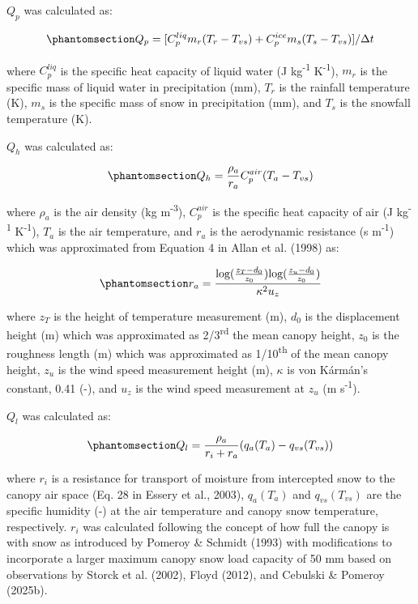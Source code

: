 \documentclass[
  letterpaper,
]{tex/uofsthesis-cs}
\begin{document}
\(Q_p\) was calculated as:

\begin{equation}\phantomsection\label{eq-qp}{
Q_p = [C_p^{liq} m_r(T_r - T_{vs}) + C_p^{ice} m_s(T_s - T_{vs})] / \Delta t
}\end{equation}

where \(C_p^{liq}\) is the specific heat capacity of liquid water (J
kg\textsuperscript{-1} K\textsuperscript{-1}), \(m_r\) is the specific
mass of liquid water in precipitation (mm), \(T_r\) is the rainfall
temperature (K), \(m_s\) is the specific mass of snow in precipitation
(mm), and \(T_s\) is the snowfall temperature (K).

\(Q_h\) was calculated as:

\begin{equation}\phantomsection\label{eq-qh}{
Q_h = \frac{\rho_a}{r_a} C_p^{air} (T_a - T_{vs})
}\end{equation}

where \(\rho_a\) is the air density (kg m\textsuperscript{-3}),
\(C_p^{air}\) is the specific heat capacity of air (J
kg\textsuperscript{-1} K\textsuperscript{-1}), \(T_a\) is the air
temperature, and \(r_a\) is the aerodynamic resistance (s
m\textsuperscript{-1}) which was approximated from Equation 4 in Allan
et al. (1998) as:

\begin{equation}\phantomsection\label{eq-ra}{
r_a = \frac{\text{log}(\frac{z_T - d_0}{z_0})\text{log}(\frac{z_u - d_0}{z_0})}{\kappa^2 u_z}
}\end{equation}

where \(z_T\) is the height of temperature measurement (m), \(d_0\) is
the displacement height (m) which was approximated as
2/3\textsuperscript{rd} the mean canopy height, \(z_0\) is the roughness
length (m) which was approximated as 1/10\textsuperscript{th} of the
mean canopy height, \(z_u\) is the wind speed measurement height (m),
\(\kappa\) is von Kármán's constant, 0.41 (-), and \(u_z\) is the wind
speed measurement at \(z_u\) (m s\textsuperscript{-1}).

\(Q_l\) was calculated as:

\begin{equation}\phantomsection\label{eq-ql}{
Q_l = \frac{\rho_a}{r_i+r_a} (q_a(T_a) - q_{vs}(T_{vs}))
}\end{equation}

where \(r_i\) is a resistance for transport of moisture from intercepted
snow to the canopy air space (Eq. 28 in Essery et al., 2003),
\(q_a(T_a)\) and \(q_{vs}(T_{vs})\) are the specific humidity (-) at the
air temperature and canopy snow temperature, respectively. \(r_i\) was
calculated following the concept of how full the canopy is with snow as
introduced by Pomeroy \& Schmidt (1993) with modifications to
incorporate a larger maximum canopy snow load capacity of 50 mm based on
observations by Storck et al. (2002), Floyd (2012), and Cebulski \&
Pomeroy (2025b).
\end{document}
